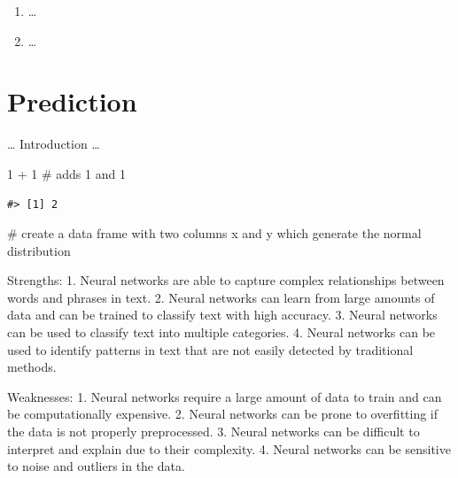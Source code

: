 \documentclass[
  letterpaper,
]{latex/krantz}
\newenvironment{Shaded}{\begin{snugshade}}{\end{snugshade}}
\newcommand{\CommentTok}[1]{\textcolor[rgb]{0.37,0.37,0.37}{#1}}
\newcommand{\DecValTok}[1]{\textcolor[rgb]{0.68,0.00,0.00}{#1}}
\newcommand{\SpecialCharTok}[1]{\textcolor[rgb]{0.37,0.37,0.37}{#1}}
\providecommand{\tightlist}{%
  \setlength{\itemsep}{0pt}\setlength{\parskip}{0pt}}\usepackage{longtable,booktabs,array}
\begin{document}

\begin{enumerate}
\def\labelenumi{\arabic{enumi}.}
\tightlist
\item
  \ldots{}
\item
  \ldots{}
\end{enumerate}

\hypertarget{sec-prediction}{%
\chapter{Prediction}\label{sec-prediction}}

\ldots{} Introduction \ldots{}

\begin{Shaded}
\begin{Highlighting}[]
\DecValTok{1} \SpecialCharTok{+} \DecValTok{1} \CommentTok{\# adds 1 and 1}
\end{Highlighting}
\end{Shaded}

\begin{verbatim}
#> [1] 2
\end{verbatim}

\begin{Shaded}
\begin{Highlighting}[]
\CommentTok{\# create a data frame with two columns x and y which generate the normal distribution}
\end{Highlighting}
\end{Shaded}

Strengths: 1. Neural networks are able to capture complex relationships
between words and phrases in text. 2. Neural networks can learn from
large amounts of data and can be trained to classify text with high
accuracy. 3. Neural networks can be used to classify text into multiple
categories. 4. Neural networks can be used to identify patterns in text
that are not easily detected by traditional methods.

Weaknesses: 1. Neural networks require a large amount of data to train
and can be computationally expensive. 2. Neural networks can be prone to
overfitting if the data is not properly preprocessed. 3. Neural networks
can be difficult to interpret and explain due to their complexity. 4.
Neural networks can be sensitive to noise and outliers in the data.
\end{document}
